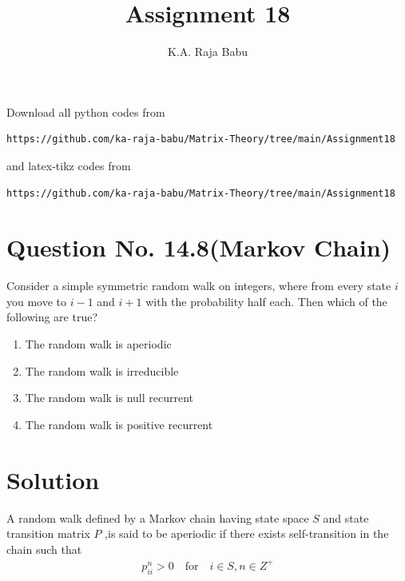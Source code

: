 \documentclass[journal,12pt,twocolumn]{IEEEtran}
\begin{document}
\makeatother
\let\StandardTheFigure\thefigure
\let\vec\mathbf
\renewcommand{\thefigure}{\theproblem}
\def\putbox#1#2#3{\makebox[0in][l]{\makebox[#1][l]{}\raisebox{\baselineskip}[0in][0in]{\raisebox{#2}[0in][0in]{#3}}}}
     \def\rightbox#1{\makebox[0in][r]{#1}}
     \def\centbox#1{\makebox[0in]{#1}}
     \def\topbox#1{\raisebox{-\baselineskip}[0in][0in]{#1}}
     \def\midbox#1{\raisebox{-0.5\baselineskip}[0in][0in]{#1}}
\vspace{3cm}
\title{Assignment 18}
\author{K.A. Raja Babu}
\maketitle
\newpage
\bigskip
\renewcommand{\thefigure}{\theenumi}
\renewcommand{\thetable}{\theenumi}
Download all python codes from 
\begin{lstlisting}
https://github.com/ka-raja-babu/Matrix-Theory/tree/main/Assignment18
\end{lstlisting}
%
and latex-tikz codes from 
%
\begin{lstlisting}
https://github.com/ka-raja-babu/Matrix-Theory/tree/main/Assignment18
\end{lstlisting}
%
\section{Question No. 14.8(Markov Chain)}

Consider a simple symmetric random walk on integers, where from every state $i$ you move to $i-1$ and $i+1$ with the probability half each. Then which of the following are true?

\begin{enumerate}
\item The random walk is aperiodic
\item The random walk is irreducible
\item The random walk is null recurrent
\item The random walk is positive recurrent
\end{enumerate}

\section{Solution}

\begin{definition}[Aperiodicity]
A random walk defined by a Markov chain having state space $S$ and state transition matrix $P$ ,is said to be aperiodic if there exists self-transition in the chain such that
\begin{align}
    p^n_{ii}>0 \quad \text{for} \quad i \in S,n \in Z^+
\end{align}
\end{definition}
\end{document}

